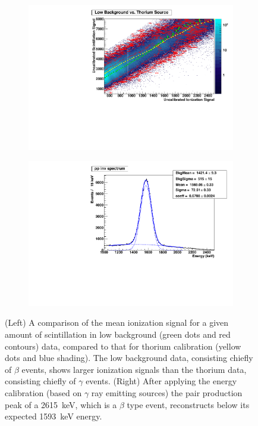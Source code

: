 \documentclass[herrin-thesis.tex]{subfiles}
\begin{document}
\begin{figure}[tbp]
\centering
	\begin{subfigure}[c]{0.48\textwidth}
	\centering
	\includegraphics[width=\textwidth]{./plots/analysis_beta_gamma_comparison.pdf}
	\end{subfigure}\hfill%
	\begin{subfigure}[c]{0.48\textwidth}
	\centering
	\includegraphics[width=\textwidth]{./plots/analysis_calibrated_pp_peak.pdf}
	\end{subfigure}
	\caption[Evidence that \(\beta\) and \(\gamma\) events might have different energy scales]{(Left) A comparison of the mean ionization signal for a given amount of scintillation in low background (green dots and red contours) data, compared to that for thorium calibration (yellow dots and blue shading). The low background data, consisting chiefly of \(\beta\) events, shows larger ionization signals than the thorium data, consisting chiefly of \(\gamma\) events. (Right) After applying the energy calibration (based on \(\gamma\) ray emitting sources) the pair production peak of a \SI{2615}{\keV}, which is a \(\beta\) type event, reconstructs below its expected \SI{1593}{\keV} energy.}
\label{fig:analysis_beta_scale}
\end{figure}
\end{document}
